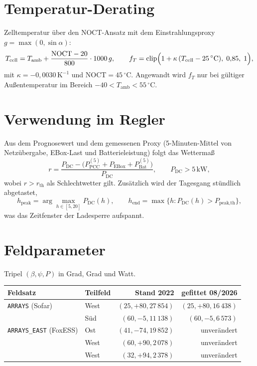 \documentclass[11pt, a4paper]{article}
\begin{document}
\section{Temperatur-Derating}

Zelltemperatur über den NOCT-Ansatz mit dem Einstrahlungsproxy
$g = \max(0, \sin\alpha)$:
\[
T_{\text{cell}} = T_{\text{amb}} + \frac{\mathrm{NOCT} - 20}{800}\cdot 1000\,g,
\qquad
f_T = \operatorname{clip}\Bigl(1 + \kappa\,(T_{\text{cell}} - 25\,^\circ\mathrm{C}),\;
0{,}85,\; 1\Bigr),
\]
mit $\kappa = -0{,}0030\,\mathrm{K}^{-1}$ und $\mathrm{NOCT} = 45\,^\circ$C.
Angewandt wird $f_T$ nur bei gültiger Außentemperatur im Bereich
$-40 < T_{\text{amb}} < 55\,^\circ$C.

\section{Verwendung im Regler}

Aus dem Prognosewert und dem gemessenen Proxy (5-Minuten-Mittel von
Netzübergabe, EBox-Last und Batterieleistung) folgt das Wettermaß
\[
r = \frac{P_{\text{DC}} - \bigl(P_{\text{PCC}}^{(5)} + P_{\text{EBox}}
      + P_{\text{Bat}}^{(5)}\bigr)}{P_{\text{DC}}},
\qquad P_{\text{DC}} > 5\,\text{kW},
\]
wobei $r > r_{\text{th}}$ als Schlechtwetter gilt. Zusätzlich wird der Tagesgang
stündlich abgetastet,
\[
h_{\text{peak}} = \arg\max_{h \in [5,20]} P_{\text{DC}}(h),
\qquad
h_{\text{end}} = \max\{h : P_{\text{DC}}(h) > P_{\text{peak,th}}\},
\]
was das Zeitfenster der Ladesperre aufspannt.

\section{Feldparameter}

Tripel $(\beta, \psi, P)$ in Grad, Grad und Watt.

\begin{center}
\begin{tabular}{llrr}
\toprule
Feldsatz & Teilfeld & Stand 2022 & gefittet 08/2026\\
\midrule
\texttt{ARRAYS} (Sofar)      & West   & $(25, +80, 27\,854)$ & $(25, +80, 16\,438)$\\
                             & Süd    & $(60, -5, 11\,138)$  & $(60, -5, 6\,573)$\\
\texttt{ARRAYS\_EAST} (FoxESS)& Ost    & $(41, -74, 19\,852)$ & unverändert\\
                             & West   & $(60, +90, 2\,078)$  & unverändert\\
                             & West   & $(32, +94, 2\,378)$  & unverändert\\
\bottomrule
\end{tabular}
\end{center}
\end{document}
